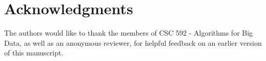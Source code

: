 \section{Acknowledgments}
\label{sec:acknowledgements}


The authors would like to thank the members of CSC 592 - Algorithms for Big Data, as well as an anonymous reviewer, for helpful feedback on an earlier version of this manuscript.
